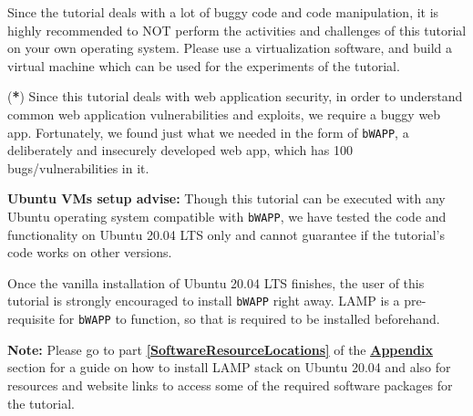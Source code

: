 \documentclass[12pt]{extarticle}
\begin{document}
\vspace{4mm}
\noindent
Since the tutorial deals with a lot of buggy code and code manipulation, it is highly recommended to NOT perform the activities and challenges of this tutorial on your own operating system. Please use a virtualization software, and build a virtual machine which can be used for the experiments of the tutorial.

\vspace{4mm}
\noindent
(\textbf{*}) Since this tutorial deals with web application security, in order to understand common web application vulnerabilities and exploits, we require a buggy web app. Fortunately, we found just what we needed in the form of \texttt{bWAPP}, a deliberately and insecurely developed web app, which has 100 bugs/vulnerabilities in it. 

\vspace{6mm}
\noindent
\label{UbuntuSetup}
\textbf{Ubuntu VMs setup advise:} Though this tutorial can be executed with any Ubuntu operating system compatible with \texttt{bWAPP}, we have tested the code and functionality on Ubuntu 20.04 LTS only and cannot guarantee if the tutorial's code works on other versions. 

\vspace{4mm}
\noindent
Once the vanilla installation of Ubuntu 20.04 LTS finishes, the user of this tutorial is strongly encouraged to install \texttt{bWAPP} right away. LAMP is a pre-requisite for \texttt{bWAPP} to function, so that is required to be installed beforehand. 

\vspace{6mm}
\noindent
\textbf{Note:} Please go to part \textbf{\underline{\ref{SoftwareResourceLocations}}} of the {\textbf{\hyperref[slide 22]{\underline{Appendix}}}} section for a guide on how to install LAMP stack on Ubuntu 20.04 and also for resources and website links to access some of the required software packages for the tutorial.  



\end{document}

